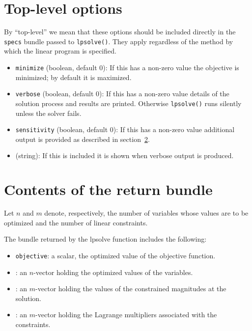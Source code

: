 \documentclass{article}
\begin{document}
\section{Top-level options}
\label{sec:gen-opts}

By ``top-level'' we mean that these options should be included
directly in the \texttt{specs} bundle passed to
\texttt{lpsolve()}. They apply regardless of the method by which the
linear program is specified.

\begin{itemize}
\item \texttt{minimize} (boolean, default 0): If this has a non-zero
  value the objective is minimized; by default it is maximized.  
\item \texttt{verbose} (boolean, default 0): If this has a non-zero
  value details of the solution process and results are
  printed. Otherwise \texttt{lpsolve()} runs silently unless the
  solver fails.
\item \texttt{sensitivity} (boolean, default 0): If this has a
  non-zero value additional output is provided as described in
  section~\ref{sec:retval}.
\item {} (string): If this is included it is shown
  when verbose output is produced.
\end{itemize}

\section{Contents of the return bundle}
\label{sec:retval}

Let $n$ and $m$ denote, respectively, the number of variables whose
values are to be optimized and the number of linear constraints.

The bundle returned by the \textsf{lpsolve} function includes the
following:
\begin{itemize}
\item \texttt{objective}: a scalar, the optimized value of the objective
  function.
\item {}: an $n$-vector holding the optimized
  values of the variables.
\item {}: an $m$-vector holding the values of
  the constrained magnitudes at the solution.
\item {}: an $m$-vector holding the Lagrange
  multipliers associated with the constraints.
\end{itemize}
\end{document}
